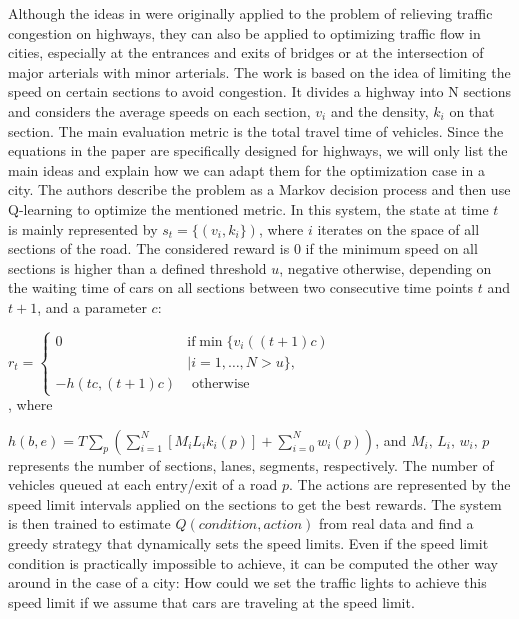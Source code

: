 \documentclass[a4paper,twoside]{article}
\begin{document}
Although the ideas in \cite{WALRAVEN2016203} were originally applied to the problem of relieving traffic congestion on highways, they can also be applied to optimizing traffic flow in cities, especially at the entrances and exits of bridges or at the intersection of major arterials with minor arterials. The work is based on the idea of limiting the speed on certain sections to avoid congestion. It divides a highway into N sections and considers the average speeds on each section, $v_{i}$ and the density, $k_{i}$ on that section. The main evaluation metric is the total travel time of vehicles. Since the equations in the paper are specifically designed for highways, we will only list the main ideas and explain how we can adapt them for the optimization case in a city. The authors describe the problem as a Markov decision process and then use Q-learning to optimize the mentioned metric. In this system, the state at time $t$ is mainly represented by $s_{t}=\{(v_{i}, k_{i}\})$, where $i$ iterates on the space of all sections of the road. The considered reward is 0 if the minimum speed on all sections is higher than a defined threshold $u$, negative otherwise, depending on the waiting time of cars on all sections between two consecutive time points $t$ and $t+1$, and a parameter $c$:

$r_{t}= \begin{cases}0 & \text{if} \min \{v_{i}((t+1) c) \\ \, & \mid i=1, \ldots, N>u\}, \\ -h(t c,(t+1) c) & \text { otherwise }\end{cases}$ \\, where

$h(b, e)=T \sum_{p}\left(\sum_{i=1}^{N}\left[M_{i} L_{i} k_{i}(p)\right]+\sum_{i=0}^{N} w_{i}(p)\right)$, and $M_{i},\,L_{i},\,{w_i},\,p$ represents the number of sections, lanes, segments, respectively. The number of vehicles queued at each entry/exit of a road $p$. The actions are represented by the speed limit intervals applied on the sections to get the best rewards. The system is then trained to estimate $Q(condition, action)$ from real data and find a greedy strategy that dynamically sets the speed limits. Even if the speed limit condition is practically impossible to achieve, it can be computed the other way around in the case of a city: How could we set the traffic lights to achieve this speed limit if we assume that cars are traveling at the speed limit.
\end{document}
